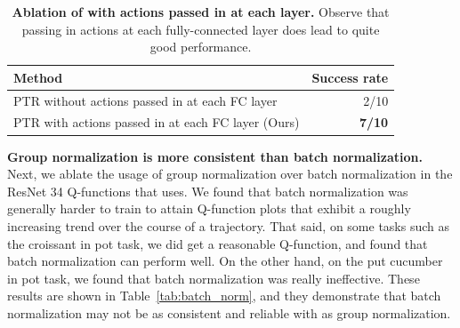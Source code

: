 \documentclass[../thesis.tex]{subfiles}
\begin{document}
\begin{table}[h]
\centering
\begin{tabular}{l|r}
\toprule
\textbf{Method} & \textbf{Success rate}\\  \midrule
PTR without actions passed in at each FC layer & 2/10 \\
PTR with actions passed in at each FC layer (Ours) & \textbf{7/10} \\
\bottomrule
\end{tabular}
\vspace{0.1cm}
\caption{\footnotesize{\textbf{Ablation of \ptrmethodname with actions passed in at each layer.} Observe that passing in actions at each fully-connected layer does lead to quite good performance.}}
\label{tab:action_sep}
\end{table}

\textbf{Group normalization is more consistent than batch normalization.} Next, we ablate the usage of group normalization over batch normalization in the ResNet 34 Q-functions that \ptrmethodname uses. We found that batch normalization was generally harder to train to attain Q-function plots that exhibit a roughly increasing trend over the course of a trajectory. That said, on some tasks such as the croissant in pot task, we did get a reasonable Q-function, and found that batch normalization can perform well. On the other hand, on the put cucumber in pot task, we found that batch normalization was really ineffective. These results are shown in {Table~\ref{tab:batch_norm}}, and they demonstrate that batch normalization may not be as consistent and reliable with \ptrmethodname as group normalization.

\begin{table}
\centering
{}
\vspace{0.1cm}
\caption{\footnotesize{\textbf{Relative performance of \ptrmethodname with batch normalization with respect to \ptrmethodname with group normalization.} Observe that while utilizing batch normalization in \ptrmethodname can be sometimes more effective than using group normalization (e.g., take croissant out of metallic bowl task), it may also be highly ineffective and can reduce success rates significantly in other tasks. The performance numbers to the left of the $\rightarrow$ correspond to the performance of \ptrmethodname with group normalization and the performance to the right of $\rightarrow$ is the performance with batch normalization.}}
\label{tab:batch_norm}
\end{table}
\end{document}
